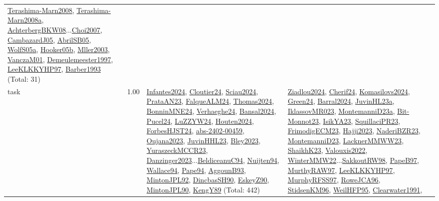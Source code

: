 {\begin{longtable}{p{3cm}r>{\raggedright\arraybackslash}p{6cm}>{\raggedright\arraybackslash}p{6cm}>{\raggedright\arraybackslash}p{8cm}}
\hyperref[detail:Terashima-Marn2008]{Terashima-Marn2008}, \hyperref[detail:Terashima-Marn2008a]{Terashima-Marn2008a}, \hyperref[detail:AchterbergBKW08]{AchterbergBKW08}...\hyperref[detail:Choi2007]{Choi2007}, \hyperref[detail:CambazardJ05]{CambazardJ05}, \hyperref[detail:AbrilSB05]{AbrilSB05}, \hyperref[detail:WolfS05a]{WolfS05a}, \hyperref[detail:Hooker05b]{Hooker05b}, \hyperref[detail:Mller2003]{Mller2003}, \hyperref[detail:VanczaM01]{VanczaM01}, \hyperref[detail:Demeulemeester1997]{Demeulemeester1997}, \hyperref[detail:LeeKLKKYHP97]{LeeKLKKYHP97}, \hyperref[detail:Barber1993]{Barber1993} (Total: 31)\\
\index{task}\index{Scheduling!task}task &  1.00 & \hyperref[detail:Infantes2024]{Infantes2024}, \hyperref[detail:Cloutier24]{Cloutier24}, \hyperref[detail:Sciau2024]{Sciau2024}, \hyperref[detail:PrataAN23]{PrataAN23}, \hyperref[detail:FalqueALM24]{FalqueALM24}, \hyperref[detail:Thomas2024]{Thomas2024}, \hyperref[detail:BonninMNE24]{BonninMNE24}, \hyperref[detail:Verhaeghe24]{Verhaeghe24}, \hyperref[detail:Bansal2024]{Bansal2024}, \hyperref[detail:Pucel24]{Pucel24}, \hyperref[detail:LuZZYW24]{LuZZYW24}, \hyperref[detail:Houten2024]{Houten2024}, \hyperref[detail:ForbesHJST24]{ForbesHJST24}, \hyperref[detail:abs-2402-00459]{abs-2402-00459}, \hyperref[detail:Oujana2023]{Oujana2023}, \hyperref[detail:JuvinHHL23]{JuvinHHL23}, \hyperref[detail:Bley2023]{Bley2023}, \hyperref[detail:YuraszeckMCCR23]{YuraszeckMCCR23}, \hyperref[detail:Danzinger2023]{Danzinger2023}...\hyperref[detail:BeldiceanuC94]{BeldiceanuC94}, \hyperref[detail:Nuijten94]{Nuijten94}, \hyperref[detail:Wallace94]{Wallace94}, \hyperref[detail:Pape94]{Pape94}, \hyperref[detail:AggounB93]{AggounB93}, \hyperref[detail:MintonJPL92]{MintonJPL92}, \hyperref[detail:DincbasSH90]{DincbasSH90}, \hyperref[detail:EskeyZ90]{EskeyZ90}, \hyperref[detail:MintonJPL90]{MintonJPL90}, \hyperref[detail:KengY89]{KengY89} (Total: 442) & \hyperref[detail:Ziadlou2024]{Ziadlou2024}, \hyperref[detail:Cherif24]{Cherif24}, \hyperref[detail:Komasilovs2024]{Komasilovs2024}, \hyperref[detail:Green24]{Green24}, \hyperref[detail:Barral2024]{Barral2024}, \hyperref[detail:JuvinHL23a]{JuvinHL23a}, \hyperref[detail:IklassovMR023]{IklassovMR023}, \hyperref[detail:MontemanniD23a]{MontemanniD23a}, \hyperref[detail:Bit-Monnot23]{Bit-Monnot23}, \hyperref[detail:IsikYA23]{IsikYA23}, \hyperref[detail:SquillaciPR23]{SquillaciPR23}, \hyperref[detail:FrimodigECM23]{FrimodigECM23}, \hyperref[detail:Hajji2023]{Hajji2023}, \hyperref[detail:NaderiBZR23]{NaderiBZR23}, \hyperref[detail:MontemanniD23]{MontemanniD23}, \hyperref[detail:LacknerMMWW23]{LacknerMMWW23}, \hyperref[detail:ShaikhK23]{ShaikhK23}, \hyperref[detail:Valouxis2022]{Valouxis2022}, \hyperref[detail:WinterMMW22]{WinterMMW22}...\hyperref[detail:SakkoutRW98]{SakkoutRW98}, \hyperref[detail:PapeB97]{PapeB97}, \hyperref[detail:MurthyRAW97]{MurthyRAW97}, \hyperref[detail:LeeKLKKYHP97]{LeeKLKKYHP97}, \hyperref[detail:MurphyRFSS97]{MurphyRFSS97}, \hyperref[detail:RoweJCA96]{RoweJCA96}, \hyperref[detail:StidsenKM96]{StidsenKM96}, \hyperref[detail:WeilHFP95]{WeilHFP95}, \hyperref[detail:Clearwater1991]{Clearwater1991}, 
\end{longtable}}
